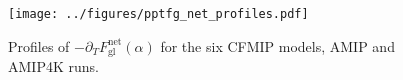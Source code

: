 \documentclass[10pt]{article}
\newcommand{\eqnref}[1]{(\ref{#1})}
\newcommand{\ppt}{\ensuremath{\partial_T}}
\newcommand{\Fnetgl}{\ensuremath{F^\mathrm{net}_{\mathrm{gl}}}}
\newcommand{\Fgl}{\ensuremath{F_{\mathrm{gl}}}}
\newcommand{\Ts}{\ensuremath{T_\mathrm{s}}}
\begin{document}


\begin{figure}[h]
	\begin{center}
			\texttt{[image: ../figures/pptfg\_net\_profiles.pdf]}
		\caption{ Profiles of $-\ppt \Fnetgl(\alpha)$ for the six CFMIP models, AMIP and AMIP4K runs.
		\label{pptfg_profiles}
		}
	\end{center}
\end{figure}

%




\end{document}

